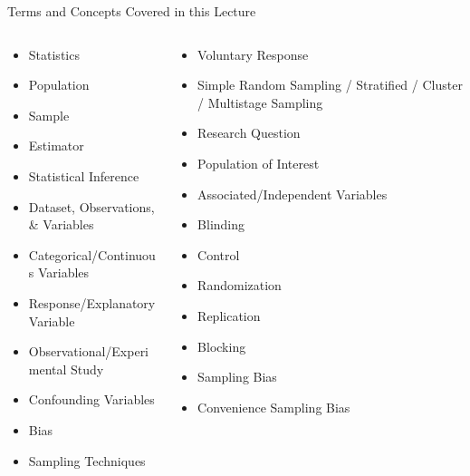\documentclass[handout]{beamer} %
\begin{document}

\begin{frame}{Terms and Concepts Covered in this Lecture}
  \addtocounter{framenumber}{-1}
\footnotesize
    \begin{columns}
        \begin{column}{0.5\textwidth}
            \begin{itemize}
                \item Statistics
                \item Population
                \item Sample
                \item Estimator
                \item Statistical Inference
                \item Dataset, Observations, \& Variables
                \item Categorical/Continuous Variables
                \item Response/Explanatory Variable
                \item Observational/Experimental Study
                \item Confounding Variables
                \item Bias
                \item Sampling Techniques
            \end{itemize}
        \end{column}
        \begin{column}{0.5\textwidth}
            \begin{itemize}

                \item Voluntary Response
                \item Simple Random Sampling / Stratified / Cluster / Multistage Sampling
                \item Research Question
                \item Population of Interest
                \item Associated/Independent Variables
                \item Blinding
                \item Control
                \item Randomization
                \item Replication
                \item Blocking
                \item Sampling Bias
                \item Convenience Sampling Bias
            \end{itemize}
        \end{column}
    \end{columns}
\end{frame}
\end{document}
